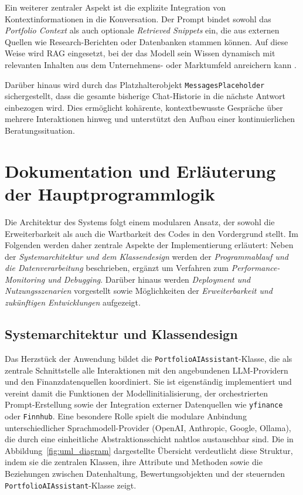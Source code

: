         Ein weiterer zentraler Aspekt ist die explizite Integration von Kontextinformationen in die Konversation.
        Der Prompt bindet sowohl das \emph{Portfolio Context} als auch optionale \emph{Retrieved Snippets} ein, die aus externen Quellen wie Research-Berichten oder Datenbanken stammen können.
        Auf diese Weise wird \acs{RAG} eingesetzt, bei der das Modell sein Wissen dynamisch mit relevanten Inhalten aus dem Unternehmens- oder Marktumfeld anreichern kann \autocite{promtingguide}.

        Darüber hinaus wird durch das Platzhalterobjekt \texttt{MessagesPlaceholder} sichergestellt, dass die gesamte bisherige Chat-Historie in die nächste Antwort einbezogen wird.
        Dies ermöglicht kohärente, kontextbewusste Gespräche über mehrere Interaktionen hinweg und unterstützt den Aufbau einer kontinuierlichen Beratungssituation.


  \section{Dokumentation und Erläuterung der Hauptprogrammlogik}

    Die Architektur des Systems folgt einem modularen Ansatz, der sowohl die Erweiterbarkeit als auch die Wartbarkeit des Codes in den Vordergrund stellt.
    Im Folgenden werden daher zentrale Aspekte der Implementierung erläutert: Neben der \emph{Systemarchitektur und dem Klassendesign} werden der \emph{Programmablauf und die Datenverarbeitung} beschrieben, ergänzt um Verfahren zum \emph{Performance-Monitoring und Debugging}.
    Darüber hinaus werden \emph{Deployment und Nutzungsszenarien} vorgestellt sowie Möglichkeiten der \emph{Erweiterbarkeit und zukünftigen Entwicklungen} aufgezeigt.

    \subsection{Systemarchitektur und Klassendesign}

      Das Herzstück der Anwendung bildet die \texttt{PortfolioAIAssistant}-Klasse, die als zentrale Schnittstelle alle Interaktionen mit den angebundenen \acs{LLM}-Providern und den Finanzdatenquellen koordiniert.
      Sie ist eigenständig implementiert und vereint damit die Funktionen der Modellinitialisierung, der orchestrierten Prompt-Erstellung sowie der Integration externer Datenquellen wie \texttt{yfinance} oder \texttt{Finnhub}.
      Eine besondere Rolle spielt die modulare Anbindung unterschiedlicher Sprachmodell-Provider (OpenAI, Anthropic, Google, Ollama), die durch eine einheitliche Abstraktionsschicht nahtlos austauschbar sind.
      Die in Abbildung~\ref{fig:uml_diagram} dargestellte Übersicht verdeutlicht diese Struktur, indem sie die zentralen Klassen, ihre Attribute und Methoden sowie die Beziehungen zwischen Datenhaltung, Bewertungsobjekten und der steuernden \texttt{PortfolioAIAssistant}-Klasse zeigt.

